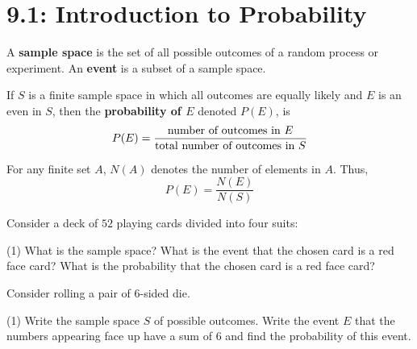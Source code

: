 \documentclass[../mathNotesPreamble]{subfiles}
\providecommand{\relscalefact}{1.4}
\begin{document}
\relscale{\relscalefact}
  \section{9.1:  Introduction to Probability}
  \begin{defn*}
    A \textbf{sample space} is the set of all possible outcomes of a random process or experiment. An \textbf{event} is a subset of a sample space.
    
    If $S$ is a finite sample space in which all outcomes are equally likely and $E$ is an even in $S$, then the \textbf{probability of $E$} denoted $P(E)$, is
      \[P(E)=\frac{\textnormal{number of outcomes in } E}{\textnormal{total number of outcomes in } S}\]
    \vspace*{0.5\baselineskip}
    
    For any finite set $A$, $N(A)$ denotes the number of elements in $A$. Thus,
      \[P(E)=\frac{N(E)}{N(S)}\]
  \end{defn*}
  \begin{ex*}
    Consider a deck of $52$ playing cards divided into four suits: 
      \raisebox{-0.6ex}{
        \hfill \scalebox{1.65}{\ensuremath{\textcolor{black}{\spadesuit}}} 
        \hfill \scalebox{1.65}{\ensuremath{\textcolor{red}{\varheartsuit}}} 
        \hfill \scalebox{1.65}{\ensuremath{\textcolor{black}{\clubsuit}}} 
        \hfill \scalebox{1.65}{\ensuremath{\textcolor{red}{\vardiamondsuit}}}
      }%
     \begin{extasks}[after-item-skip=\stretch{1}](1)
       \task What is the sample space?
       \task What is the event that the chosen card is a red face card?
       \task What is the probability that the chosen card is a red face card?
     \end{extasks}
  \end{ex*}
  \pagebreak

  \begin{ex*}
    Consider rolling a pair of $6$-sided die. 
    \begin{extasks}[after-item-skip=\stretch{1}](1)
      \task Write the sample space $S$ of possible outcomes.
      \task Write the event $E$ that the numbers appearing face up have a sum of $6$ and find the probability of this event.
    \end{extasks}
  \end{ex*}
  \pagebreak
\end{document}
